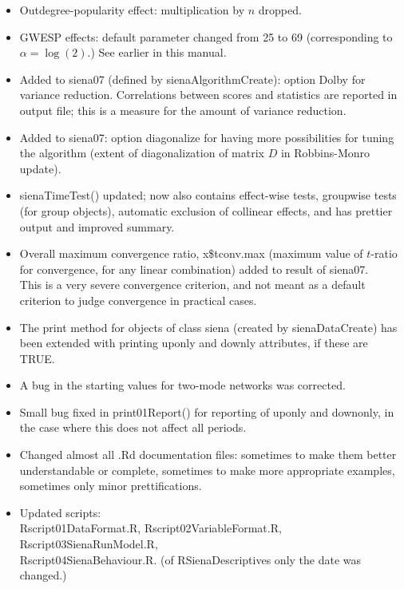 \documentclass[a4paper,fleqn,11pt]{article}
\newcommand{\+}{\, + \,}
\newcommand{\sfn}[1]{\textsf{#1}}
\begin{document}
{\begin{small}
\begin{itemize}
\begin{itemize}
		shared incoming xxxxxx, \sfn{sharedIn}
	\item Outdegree-popularity effect: multiplication by $n$ dropped.
	\item GWESP effects: default parameter changed from 25 to 69
		(corresponding to $\alpha = \log(2)$.) See earlier in this manual.
	\item Added to \sfn{siena07} (defined by \sfn{sienaAlgorithmCreate}):
		option \sfn{Dolby} for variance reduction.
		Correlations between scores and statistics are reported in output file;
		this is a measure for the amount of variance reduction.
	\item Added to \sfn{siena07}:
		option \sfn{diagonalize} for having more possibilities for
		tuning the algorithm
		(extent of diagonalization of matrix $D$ in Robbins-Monro update).
	\item \sfn{sienaTimeTest()} updated; now also contains effect-wise tests,
		groupwise tests (for group objects), automatic exclusion of
		collinear effects, and has prettier output and improved	summary.
	\item Overall maximum convergence ratio, \sfn{x\$tconv.max}
		(maximum value of $t$-ratio for convergence, for any linear combination)
		added to result of \sfn{siena07}.\\
        This is a very severe convergence criterion, and not meant as a default
        criterion to judge convergence in practical cases.
	\item The \sfn{print} method for objects of class \sfn{siena} (created by
        \sfn{sienaDataCreate})
		has been extended with printing \sfn{uponly} and \sfn{downly} attributes,
		if these are TRUE.
	\item A bug in the starting values for two-mode networks was corrected.
	\item Small bug fixed in \sfn{print01Report()} for reporting of \sfn{uponly}
        and \sfn{downonly},
		in the case where this does not affect all periods.
	\item Changed almost all \sfn{.Rd} documentation files: sometimes to make them
		better understandable or complete, sometimes to make more appropriate
		examples, sometimes only minor prettifications.
	\item Updated scripts:\\
		Rscript01DataFormat.R, Rscript02VariableFormat.R,
 	 	Rscript03SienaRunModel.R,\\
 	 	Rscript04SienaBehaviour.R.
		(of RSienaDescriptives only the date was changed.)
  \end{itemize}


\end{itemize}
\end{small}}
\end{document}
